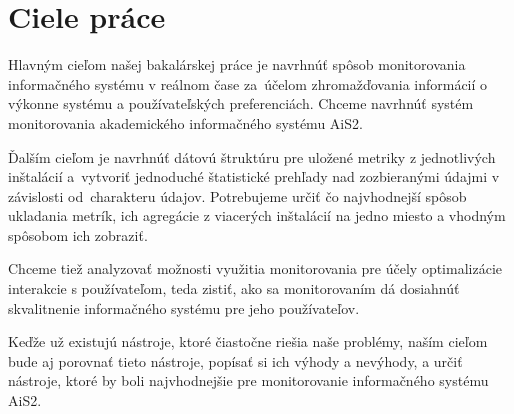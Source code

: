 \documentclass[a4paper, upjsfrontpage, disablespecwarning, thesismargins, thesislinespacing]{rnthesis}
\begin{document}

\section{Ciele práce}


Hlavným cieľom našej bakalárskej práce je navrhnúť spôsob monitorovania informačného systému v reálnom čase za~úče\-lom zhromažďovania informácií o výkonne systému a používateľských pre\-ferenciách. 
Chceme navrhnúť systém monitorovania akademického informačného systému AiS2.

Ďalším cieľom je navrhnúť dátovú štruktúru pre uložené metriky z jednotlivých inštalácií a~vytvoriť jednoduché štatistické prehľady nad zozbieranými údajmi v závis\-losti od~charakteru údajov.
Potrebujeme určiť čo najvhodnejší spôsob ukladania metrík, ich agregácie z viacerých inštalácií na jedno miesto a vhodným spôsobom ich zobraziť.

Chceme tiež analyzovať možnosti využitia monitorovania pre účely optimalizácie interakcie s používateľom, teda zistiť, ako sa monitorovaním dá dosiahnúť skvalitnenie informačného systému pre jeho používateľov.

Keďže už existujú nástroje, ktoré čiastočne riešia naše problémy, naším cieľom bude aj porovnať tieto nástroje, popísať si ich výhody a nevýhody, a určiť nástroje, ktoré by boli najvhodnejšie pre monitorovanie informačného systému AiS2.

\newpage

\end{document}
